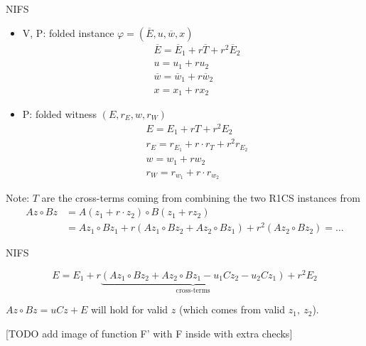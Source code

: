 \documentclass{beamer}
\begin{document}
\begin{frame}{NIFS}
\begin{footnotesize}

\begin{itemize}
      \item V, P: folded instance $\varphi = (\overline{E}, u, \overline{w}, x)$
	      \begin{align*}
		      &\overline{E}=\overline{E}_1 + r \overline{T} + r^2 \overline{E}_2\\
		      &u = u_1 + r u_2\\
		      &\overline{w} = \overline{w}_1 + r \overline{w}_2\\
		      &x = x_1 + r x_2
	      \end{align*}
      \item P: folded witness $(E, r_E, w, r_W)$
	      \begin{align*}
		      &E = E_1 + r T + r^2 E_2\\
		      &r_E = r_{E_1} + r \cdot r_T + r^2 r_{E_2}\\
		      &w=w_1 + r w_2\\
		      &r_W = r_{w_1} + r \cdot r_{w_2}
	      \end{align*}
\end{itemize}
\end{footnotesize}
\pause
\begin{scriptsize}
Note: $T$ are the cross-terms coming from combining the two R1CS instances from
\begin{align*}
  Az \circ Bz &=A(z_1 + r \cdot z_2) \circ B(z_1 + r z_2)\\
	      &=A z_1 \circ B z_1 + r(A z_1 \circ B z_2 + A z_2 \circ B z_1) + r^2 (A z_2 \circ B z_2) = \ldots
\end{align*}
\end{scriptsize}

\end{frame}

\begin{frame}{NIFS}

\begin{small}
$$E=E_1 + r \underbrace{ (A z_1 \circ B z_2 + A z_2 \circ B z_1 - u_1 C z_2 - u_2 C z_1) }_\text{cross-terms} + r^2 E_2$$
\end{small}

$Az \circ Bz = uCz + E$ will hold for valid $z$ (which comes from valid $z_1,~ z_2$).

[TODO add image of function F' with F inside with extra checks]

\end{frame}
\end{document}
